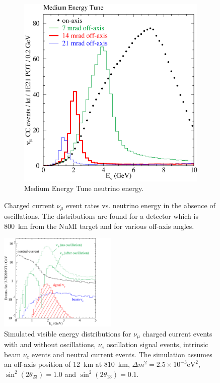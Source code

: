 \begin{figure}
\begin{subfigure}[b]{0.45\textwidth}
    \includegraphics[width=\textwidth]{../../img/baird/beam/050-me-spectra.png}
    \caption{Medium Energy Tune neutrino energy.}
    \label{fig:NuESpectra_MEAndLE_b}
  \end{subfigure}
  \caption{Charged current $\nu_{\mu}$ event rates vs. neutrino
    energy in the absence of oscillations. The distributions are found
  for a detector which is 800~km from the NuMI target and for various
  off-axis angles.~\cite{TDR}}
  \label{fig:NuESpectra_MEAndLE}
\end{figure}


\begin{figure}
  \centering
  \includegraphics[width=0.5\textwidth]{../../img/beam/060-sig-and-bg-rates-thumb.png}
  \caption{Simulated visible energy distributions for $\nu_{\mu}$ charged current
    events with and without oscillations, $\nu_e$ oscillation signal events,
    intrinsic beam $\nu_e$ events and neutral current events. The
    simulation assumes an off-axis position of 12~km at 810~km, $\Delta m^2 = 2.5 \times 10^{-3}
    \textrm{eV}^2$, $\sin^2(2\theta_{23}) = 1.0$ and
  $\sin^2(2\theta_{13}) = 0.1$.~\cite{TDR}}
  \label{fig:NuMIBeamComp}
\end{figure}


